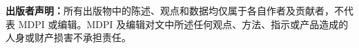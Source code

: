 \documentclass[UTF8,a4paper,11pt,fontset=windows]{ctexart}
\begin{document}
\setcounter{page}{32}












\clearpage

\clearpage
\renewcommand{\refname}{参考文献}
{\small\raggedright\setlength{\bibsep}{5pt}

}
\medskip
\noindent\textbf{出版者声明：}所有出版物中的陈述、观点和数据均仅属于各自作者及贡献者，不代表 MDPI 或编辑。MDPI 及编辑对文中所述任何观点、方法、指示或产品造成的人身或财产损害不承担责任。
\end{document}
